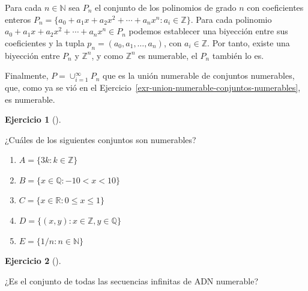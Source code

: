 \documentclass[
  a4paper,
]{scrreport}
\providecommand{\tightlist}{%
  \setlength{\itemsep}{0pt}\setlength{\parskip}{0pt}}\usepackage{longtable,booktabs,array}
\theoremstyle{definition}
\newtheorem{exercise}{Ejercicio}[chapter]
\theoremstyle{remark}
\begin{document}
\begin{tcolorbox}[enhanced jigsaw, coltitle=black, left=2mm, opacityback=0, colback=white, opacitybacktitle=0.6, breakable, colbacktitle=quarto-callout-tip-color!10!white, leftrule=.75mm, toptitle=1mm, arc=.35mm, bottomtitle=1mm, rightrule=.15mm, titlerule=0mm, title=\textcolor{quarto-callout-tip-color}{\faLightbulb}\hspace{0.5em}{Solución}, colframe=quarto-callout-tip-color-frame, toprule=.15mm, bottomrule=.15mm]
Para cada \(n\in\mathbb{N}\) sea \(P_n\) el conjunto de los polinomios
de grado \(n\) con coeficientes enteros
\(P_n=\{a_0+a_1x+a_2x^2+\cdots+a_nx^n: a_i\in \mathbb{Z}\}\). Para cada
polinomio \(a_0+a_1x+a_2x^2+\cdots+a_nx^n\in P_n\) podemos establecer
una biyección entre sus coeficientes y la tupla
\(p_n=(a_0,a_1,\ldots,a_n)\), con \(a_i\in\mathbb{Z}\). Por tanto,
existe una biyección entre \(P_n\) y \(\mathbb{Z}^n\), y como
\(\mathbb{Z}^n\) es numerable, el \(P_n\) también lo es.

Finalmente, \(P=\cup_{i=1}^\infty P_n\) que es la unión numerable de
conjuntos numerables, que, como ya se vió en el
Ejercicio~\ref{exr-union-numerable-conjuntos-numerables}, es numerable.
\end{tcolorbox}

\leavevmode{}%
\begin{exercise}[]\label{exr-conjuntos-numerables}

¿Cuáles de los siguientes conjuntos son numerables?

\begin{enumerate}
\def\labelenumi{\alph{enumi}.}
\tightlist
\item
  \(A=\{3k: k\in \mathbb{Z}\}\)
\item
  \(B=\{x\in \mathbb{Q}: -10 < x < 10\}\)
\item
  \(C = \{x\in \mathbb{R}: 0\leq x\leq 1\}\)
\item
  \(D=\{(x,y): x\in \mathbb{Z}, y\in \mathbb{Q}\}\)
\item
  \(E=\{1/n : n\in \mathbb{N}\}\)
\end{enumerate}

\end{exercise}

\leavevmode{}%
\begin{exercise}[]\label{exr-conjunto-secuencias-adn-numerable}

¿Es el conjunto de todas las secuencias infinitas de ADN numerable?

\end{exercise}
\end{document}
